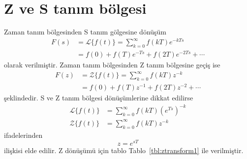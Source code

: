 \chapter{Z ve S tanım bölgesi}
Zaman tanım bölgesinden S tanım gölgesine dönüşüm
\begin{equation}
\begin{split}
    F(s)&=\mathcal{L}\{f(t)\}=\sum_{k=0}^{\infty}f(kT)e^{-kTs}\\
    &=f(0)+f(T)e^{-Ts}+f(2T)e^{-2Ts}+\cdots
\end{split}
\end{equation}
olarak verilmiştir. Zaman tanım bölgesinden Z tanım bölgesine geçiş ise
\begin{equation}
    \begin{split}
        F(z)&=\mathcal{Z}\{f(t)\}=\sum_{k=0}^{\infty}f(kT)z^{-k}\\
        &=f(0)+f(T)z^{-1}+f(2T)z^{-2}+\cdots
    \end{split}
\end{equation}
şeklindedir. S ve Z tanım bölgesi dönüşümlerine dikkat edilirse
\begin{equation}
    \begin{split}
        \mathcal{L}\{f(t)\}&=\sum_{k=0}^{\infty}f(kT)(e^{Ts})^{-k}\\
        \mathcal{Z}\{f(t)\}&=\sum_{k=0}^{\infty}f(kT)z^{-k}
\end{split}
\end{equation}
ifadelerinden
\begin{equation}
    z=e^{sT}
\end{equation}
ilişkisi elde edilir.
Z dönüşümü için tablo Tablo~\ref{tbl:ztransform1} ile verilmiştir.

